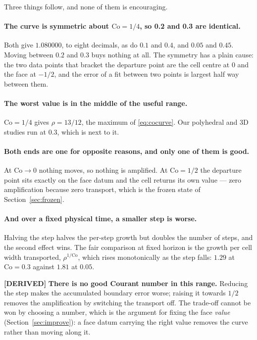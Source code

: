 \documentclass[11pt,a4paper]{article}
\newcommand{\derived}{\textcolor{blue!50!black}{\textbf{[DERIVED]}}}
\begin{document}
Three things follow, and none of them is encouraging.

\paragraph{The curve is symmetric about $\mathrm{Co} = 1/4$, so 0.2 and 0.3 are identical.}
Both give $1.080000$, to eight decimals, as do $0.1$ and $0.4$, and $0.05$ and $0.45$. Moving
between $0.2$ and $0.3$ buys nothing at all. The symmetry has a plain cause: the two data points
that bracket the departure point are the cell centre at $0$ and the face at $-1/2$, and the
error of a fit between two points is largest half way between them.

\paragraph{The worst value is in the middle of the useful range.} $\mathrm{Co} = 1/4$ gives
$\rho = 13/12$, the maximum of \eqref{eq:cocurve}. Our polyhedral and 3D studies run at $0.3$,
which is next to it.

\paragraph{Both ends are one for opposite reasons, and only one of them is good.} At
$\mathrm{Co} \to 0$ nothing moves, so nothing is amplified. At $\mathrm{Co} = 1/2$ the departure
point sits exactly on the face datum and the cell returns its own value --- zero amplification
because zero transport, which is the frozen state of Section~\ref{sec:frozen}.

\paragraph{And over a fixed physical time, a smaller step is worse.} Halving the step halves the
per-step growth but doubles the number of steps, and the second effect wins. The fair comparison
at fixed horizon is the growth per cell width transported, $\rho^{1/\mathrm{Co}}$, which rises
monotonically as the step falls: $1.29$ at $\mathrm{Co} = 0.3$ against $1.81$ at $0.05$.

\derived{} \textbf{There is no good Courant number in this range.} Reducing the step makes the
accumulated boundary error worse; raising it towards $1/2$ removes the amplification by
switching the transport off. The trade-off cannot be won by choosing a number, which is the
argument for fixing the face \emph{value} (Section~\ref{sec:improve}): a face datum carrying the
right value removes the curve rather than moving along it.
\end{document}
